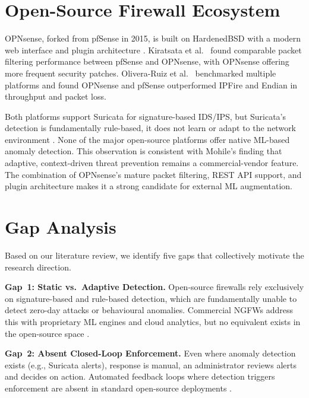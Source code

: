 \documentclass[conference]{IEEEtran}
\begin{document}
\section{Open-Source Firewall Ecosystem}
\label{sec:opensource}

OPNsense, forked from pfSense in 2015, is built on HardenedBSD with a modern web interface and plugin architecture \cite{che2023opnsense}. Kiratsata et al.\ \cite{kiratsata2022behaviour} found comparable packet filtering performance between pfSense and OPNsense, with OPNsense offering more frequent security patches. Olivera-Ruiz et al.\ \cite{olivera2024opensource} benchmarked multiple platforms and found OPNsense and pfSense outperformed IPFire and Endian in throughput and packet loss.

Both platforms support Suricata for signature-based IDS/IPS, but Suricata's detection is fundamentally rule-based, it does not learn or adapt to the network environment \cite{dini2023overview}. None of the major open-source platforms offer native ML-based anomaly detection. This observation is consistent with Mohile's \cite{mohile2023ngfw} finding that adaptive, context-driven threat prevention remains a commercial-vendor feature. The combination of OPNsense's mature packet filtering, REST API support, and plugin architecture makes it a strong candidate for external ML augmentation.

\section{Gap Analysis}
\label{sec:gap}

Based on our literature review, we identify five gaps that collectively motivate the research direction.

\textbf{Gap~1: Static vs.\ Adaptive Detection.} Open-source firewalls rely exclusively on signature-based and rule-based detection, which are fundamentally unable to detect zero-day attacks or behavioural anomalies. Commercial NGFWs address this with proprietary ML engines and cloud analytics, but no equivalent exists in the open-source space \cite{liu2019mlids, ahmad2021nids}.

\textbf{Gap~2: Absent Closed-Loop Enforcement.} Even where anomaly detection exists (e.g., Suricata alerts), response is manual, an administrator reviews alerts and decides on action. Automated feedback loops where detection triggers enforcement are absent in standard open-source deployments \cite{psychogyios2024ddos}.
\end{document}

